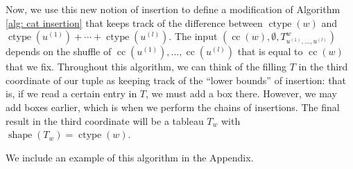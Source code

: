 \documentclass[ALCO, Unicode]{cedram}
\DeclareMathOperator{\ctype}{ctype}
\DeclareMathOperator{\shape}{shape}
\DeclareMathOperator{\cc}{cc}
\begin{document}
Now, we use this new notion of insertion to define a modification of Algorithm \ref{alg: cat insertion} that keeps track of the difference between $\ctype(w)$ and $\ctype(u^{(1)})+ \cdots + \ctype(u^{(l)})$. 
The input $(\cc(w), \emptyset, T^w_{u^{(1)}, \dots, u^{(l)}})$ depends on the shuffle of $\cc(u^{(1)}),\dots, \cc( u^{(l)})$ that is equal to $\cc(w)$ that we fix. Throughout this algorithm, we can think of the filling $T$ in the third coordinate of our tuple as keeping track of the ``lower bounds'' of insertion: that is, if we read a certain entry in $T$, we must add a box there. However, we may add boxes earlier, which is when we perform the chains of insertions.  The final result in the third coordinate will be a tableau $T_w$ with $\shape(T_w) = \ctype(w)$.

We include an example of this algorithm in the Appendix. 
\end{document}
